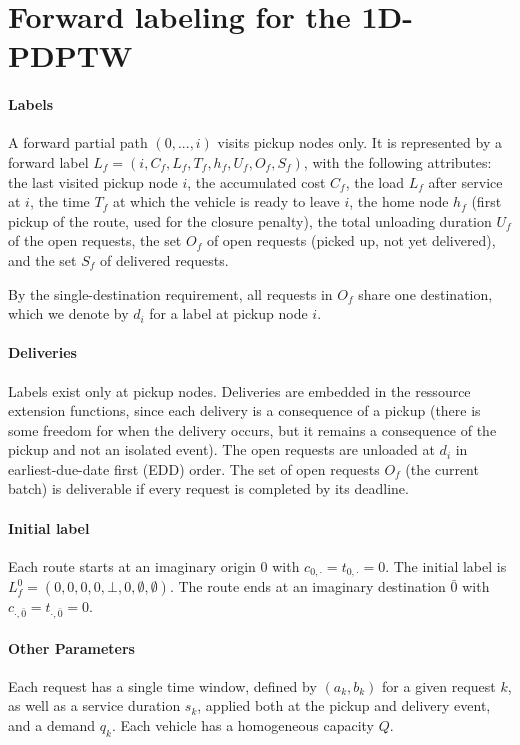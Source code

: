 \documentclass[preprint,11pt,authoryear]{elsarticle}
\begin{document}
\newpage

\section{Forward labeling for the 1D-PDPTW}
\label{sec:forward-labeling}

\paragraph{Labels}
A forward partial path $(0, ..., i)$ visits pickup nodes only. It is represented by a forward label
$L_f = (i, C_f, L_f, T_f, h_f, U_f, O_f, S_f)$, with the following attributes:
the last visited pickup node $i$,
the accumulated cost $C_f$,
the load $L_f$ after service at $i$,
the time $T_f$ at which the vehicle is ready to leave $i$,
the home node $h_f$ (first pickup of the route, used for the closure penalty),
the total unloading duration $U_f$ of the open requests,
the set $O_f$ of open requests (picked up, not yet delivered), and
the set $S_f$ of delivered requests.

By the single-destination requirement, all requests in $O_f$ share one destination, which we denote by 
$d_i$ for a label at pickup node $i$. 

\paragraph{Deliveries}
Labels exist only at pickup nodes. Deliveries are embedded in the ressource extension functions, since 
each delivery is a consequence of a pickup (there is some freedom for when the delivery occurs, but it
remains a consequence of the pickup and not an isolated event). The open requests are unloaded at $d_i$ in 
earliest-due-date first (EDD) order. The set of open requests $O_f$ (the current batch) is deliverable if every 
request is completed by its deadline. 

\paragraph{Initial label}
Each route starts at an imaginary origin $0$ with $c_{0,\cdot} = t_{0,\cdot} = 0$. 
The initial label is $L_f^0 = (0, 0, 0, 0, \bot, 0, \emptyset, \emptyset)$. 
The route ends at an imaginary destination $\bar 0$ with $c_{\cdot,\bar 0} = t_{\cdot,\bar 0} = 0$.

\paragraph{Other Parameters}
Each request has a single time window, defined by $(a_k, b_k)$ for a given request $k$, as well as a service duration $s_k$, 
applied both at the pickup and delivery event, and a demand $q_k$. Each vehicle has a homogeneous capacity $Q$.
\end{document}
